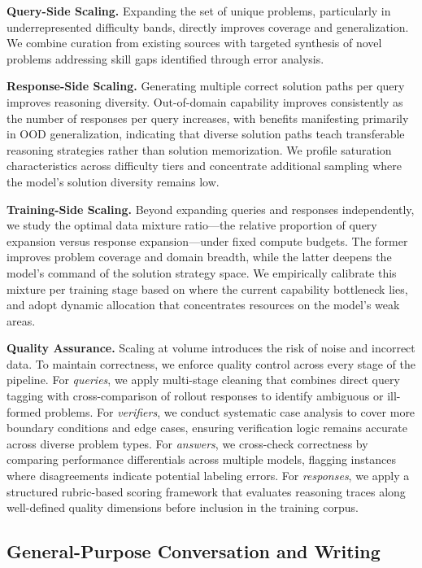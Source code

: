 \noindent \textbf{Query-Side Scaling.} Expanding the set of unique problems, particularly in underrepresented difficulty bands, directly improves coverage and generalization. We combine curation from existing sources with targeted synthesis of novel problems addressing skill gaps identified through error analysis.

\noindent \textbf{Response-Side Scaling.} Generating multiple correct solution paths per query improves reasoning diversity. Out-of-domain capability improves consistently as the number of responses per query increases, with benefits manifesting primarily in OOD generalization, indicating that diverse solution paths teach transferable reasoning strategies rather than solution memorization. We profile saturation characteristics across difficulty tiers and concentrate additional sampling where the model's solution diversity remains low.

\noindent \textbf{Training-Side Scaling.} Beyond expanding queries and responses independently, we study the optimal data mixture ratio---the relative proportion of query expansion versus response expansion---under fixed compute budgets. The former improves problem coverage and domain breadth, while the latter deepens the model's command of the solution strategy space. We empirically calibrate this mixture per training stage based on where the current capability bottleneck lies, and adopt dynamic allocation that concentrates resources on the model's weak areas.

\noindent \textbf{Quality Assurance.} Scaling at volume introduces the risk of noise and incorrect data. To maintain correctness, we enforce quality control across every stage of the pipeline. For \textit{queries}, we apply multi-stage cleaning that combines direct query tagging with cross-comparison of rollout responses to identify ambiguous or ill-formed problems. For \textit{verifiers}, we conduct systematic case analysis to cover more boundary conditions and edge cases, ensuring verification logic remains accurate across diverse problem types. For \textit{answers}, we cross-check correctness by comparing performance differentials across multiple models, flagging instances where disagreements indicate potential labeling errors. For \textit{responses}, we apply a structured rubric-based scoring framework that evaluates reasoning traces along well-defined quality dimensions before inclusion in the training corpus.


\subsection{General-Purpose Conversation and Writing}

